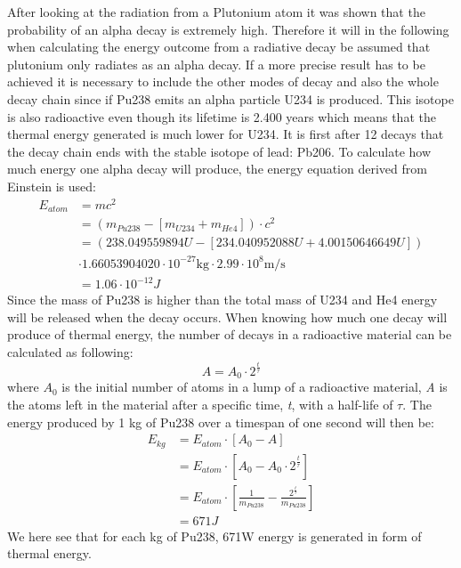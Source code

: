 \label{sec:HeatGeneration}
After looking at the radiation from a Plutonium atom it was shown that the probability of an alpha decay is extremely high. Therefore it will in the following when calculating the energy outcome from a radiative decay be assumed that plutonium only radiates as an alpha decay. If a more precise result has to be achieved it is necessary to include the other modes of decay and also the whole decay chain since if Pu238 emits an alpha particle U234 is produced. This isotope is also radioactive even though its lifetime is 2.400 years which means that the thermal energy generated is much lower for U234. It is first after 12 decays that the decay chain ends with the stable isotope of lead: Pb206\cite{website:plutonium}. To calculate how much energy one alpha decay will produce, the energy equation derived from Einstein is used:
\begin{equation}
\begin{aligned} 
\text{$E_{atom}$} & ={} mc^2 \\
& = (m_{Pu238} - [m_{U234} + m_{He4}]) \cdot c^2 \\
& = (238.049559894U - [234.040952088U + 4.00150646649U])\\
& \cdot 1.66053904020\cdot 10^{-27}\text{kg} \cdot 2.99\cdot 10^8 \text{m/s}\\
& = 1.06\cdot 10^{-12} J 
\end{aligned}
\end{equation}
Since the mass of Pu238 is higher than the total mass of U234 and He4 energy will be released when the decay occurs. When knowing how much one decay will produce of thermal energy, the number of decays in a radioactive material can be calculated as following\cite{website:decay}:
\begin{equation}\label{eq:halflife}
A = A_0 \cdot 2^{\frac{t}{\tau}}
\end{equation}
where \textit{$A_0$} is the initial number of atoms in a lump of a radioactive material, \textit{A} is the atoms left in the material after a specific time, \textit{t}, with a half-life of  \textit{$\tau$}. The energy produced by 1 kg of Pu238 over a timespan of one second will then be: 
\begin{equation}
\begin{aligned} 
\text{$E_{kg}$} & ={} E_{atom} \cdot [A_0 - A] \\
& = E_{atom} \cdot \left[A_0 - A_0 \cdot 2^{\frac{t}{\tau}}\right] \\
& = E_{atom}  \cdot \left[\frac{1}{m_{Pu238}} - \frac{2^{\frac{t}{\tau}}}{m_{Pu238}} \right] \\
& = 671 J
\end{aligned}
\end{equation}
We here see that for each kg of Pu238, 671W energy is generated in form of thermal energy.  \\

